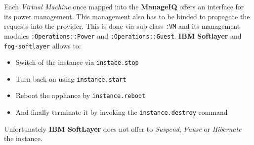 Each \emph{Virtual Machine} once mapped into the \textbf{ManageIQ} offers an interface for its power management. This management also has to be binded to propagate the requests into the provider. This is done via sub-class \texttt{:VM} and its management modules \texttt{:Operations::Power} and \texttt{:Operations::Guest}. \textbf{IBM Softlayer} and \texttt{fog-softlayer} allows to:

\begin{itemize}
	\item Switch of the instance via \texttt{instace.stop}
	\item Turn back on using \texttt{instance.start}
	\item Reboot the appliance by \texttt{instance.reboot}
	\item And finally terminate it by invoking the \texttt{instance.destroy} command
\end{itemize}

Unfortunately \textbf{IBM SoftLayer} does not offer to \emph{Suspend}, \emph{Pause} or \emph{Hibernate} the instance.

